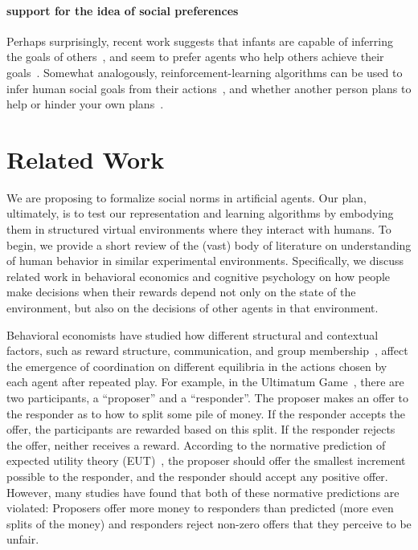 
\paragraph{support for the idea of social preferences}
Perhaps surprisingly, recent work suggests that infants are capable of
inferring the goals of others~\cite{gergely95}, and seem to prefer
agents who help others achieve their goals~\cite{hamlin13,hamlin07}.
Somewhat analogously, reinforcement-learning algorithms can be
used to infer human social goals from their actions~\cite{baker09},
and whether another person plans to help or hinder your own
plans~\cite{ullman09}.

\section{Related Work}
\label{sec:related}

We are proposing to formalize social norms in artificial agents.  Our
plan, ultimately, is to test our representation and learning
algorithms by embodying them in structured virtual environments where
they interact with humans.  To begin, we provide a short review of the
(vast) body of literature on understanding of human behavior in
similar experimental environments.  Specifically, we discuss related
work in behavioral economics and cognitive psychology on how people
make decisions when their rewards depend not only on the state of the
environment, but also on the decisions of other agents in that
environment.

Behavioral economists have studied how different structural and
contextual factors, such as reward structure, communication, and group
membership~\cite{Camerer:2003}, affect the emergence of coordination
on different equilibria in the actions chosen by each agent after
repeated play. For example, in the Ultimatum Game~\cite{guth82}, there
are two participants, a ``proposer'' and a ``responder''. The proposer
makes an offer to the responder as to how to split some pile of
money. If the responder accepts the offer, the participants are
rewarded based on this split. If the responder rejects the offer,
neither receives a reward. According to the normative prediction of
expected utility theory (EUT)~\cite{vonneumann44}, the proposer should
offer the smallest increment possible to the responder, and the
responder should accept any positive offer. However, many studies have
found that both of these normative predictions are violated: Proposers
offer more money to responders than predicted (more even splits of the
money) and responders reject non-zero offers that they perceive to be
unfair.

